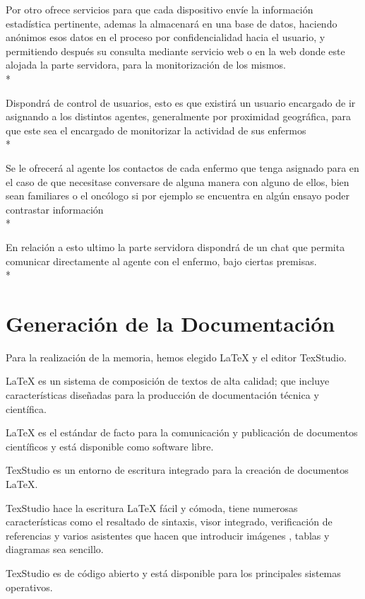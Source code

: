 \documentclass[../pfc.tex]{subfiles}
\begin{document}
	Por otro ofrece servicios para que cada dispositivo envíe la información estadística pertinente, ademas la almacenará en una base de datos, haciendo anónimos esos datos en el proceso por confidencialidad hacia el usuario, y permitiendo después su consulta mediante servicio web o en la web donde este alojada la parte servidora, para la monitorización de los mismos.\\*
	
	Dispondrá de control de usuarios, esto es que existirá un usuario encargado de ir asignando a los distintos agentes, generalmente por proximidad geográfica, para que este sea el encargado de monitorizar la actividad de sus enfermos \\*
	
	Se le ofrecerá al agente los contactos de cada enfermo que tenga asignado para en el caso de que necesitase conversare de alguna manera con alguno de ellos, bien sean familiares o el oncólogo si por ejemplo se encuentra en algún ensayo poder contrastar información\\*
	
	En relación a esto ultimo la parte servidora dispondrá de un chat que permita comunicar directamente al agente con el enfermo, bajo ciertas premisas.\\* 
	
	\clearpage
	
	\section{Generación de la Documentación}
	
	Para la realización de la memoria, hemos elegido LaTeX y el editor TexStudio.
	
	LaTeX es un sistema de composición de textos de alta calidad; que incluye características diseñadas para la producción de documentación técnica y científica.
	
	LaTeX es el estándar de facto para la comunicación y publicación de documentos científicos y está disponible como software libre.
	
	TexStudio es un entorno de escritura integrado para la creación de documentos LaTeX. 
	
	TexStudio hace la escritura LaTeX fácil y cómoda, tiene numerosas características como el resaltado de sintaxis, visor integrado, verificación de referencias y varios asistentes que hacen que introducir imágenes , tablas y diagramas sea sencillo. 
	
	TexStudio es de código abierto y está disponible para los principales sistemas operativos.
	
\end{document}
